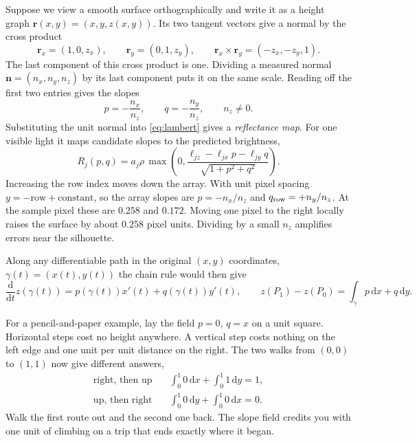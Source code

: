 \documentclass[11pt,a4paper]{article}
\numberwithin{equation}{section}
\newcommand{\dd}{\mathrm{d}}
\begin{document}
Suppose we view a smooth surface orthographically and write it as a height
graph $\mathbf r(x,y)=(x,y,z(x,y))$. Its two tangent vectors give a normal
by the cross product
\begin{equation}
  \mathbf r_x=(1,0,z_x),\qquad \mathbf r_y=(0,1,z_y),\qquad
  \mathbf r_x\times\mathbf r_y=(-z_x,-z_y,1).
\end{equation}
The last component of this cross product is one. Dividing a measured
normal $\mathbf n=(n_x,n_y,n_z)$ by its last component puts it on
the same scale. Reading off the first two entries gives the slopes
\begin{equation}
  p=-\frac{n_x}{n_z},\qquad q=-\frac{n_y}{n_z},\qquad n_z\ne 0.
  \label{eq:slopes}
\end{equation}
Substituting the unit normal into \eqref{eq:lambert} gives a
\emph{reflectance map}. For one visible light it maps candidate slopes to
the predicted brightness,
\begin{equation}
 R_j(p,q)=a_j\rho\,\max\!\left(0,
 \frac{\ell_{jz}-\ell_{jx}p-\ell_{jy}q}{\sqrt{1+p^2+q^2}}\right).
\end{equation}
Increasing the row index moves down the array. With unit pixel spacing
$y=-\mathrm{row}+\mathrm{constant}$, so the array slopes are
$p=-n_x/n_z$ and $q_{\rm row}=+n_y/n_z$. At the sample pixel these are
$0.258$ and $0.172$. Moving one pixel to the right locally raises the surface
by about $0.258$ pixel units. Dividing by a small $n_z$ amplifies errors
near the silhouette.

Along any differentiable path in the original $(x,y)$ coordinates,
$\gamma(t)=(x(t),y(t))$ the chain rule would then give
\begin{equation}
  \frac{\dd}{\dd t}z(\gamma(t))
     =p(\gamma(t))x'(t)+q(\gamma(t))y'(t),\qquad
  z(P_1)-z(P_0)=\int_\gamma p\,\dd x+q\,\dd y .
  \label{eq:path}
\end{equation}

For a pencil-and-paper example, lay the field $p=0$, $q=x$ on a unit
square. Horizontal steps cost no height anywhere. A vertical step costs
nothing on the left edge and one unit per unit distance on the right.
The two walks from $(0,0)$ to $(1,1)$ now give different answers,
\begin{align}
  \text{right, then up}\quad &\int_0^1 0\,\dd x+\int_0^1 1\,\dd y=1,
  \nonumber\\
  \text{up, then right}\quad &\int_0^1 0\,\dd y+\int_0^1 0\,\dd x=0.
  \label{eq:two-walks}
\end{align}
Walk the first route out and the second one back. The slope field credits
you with one unit of climbing on a trip that ends exactly where it began.
\end{document}
